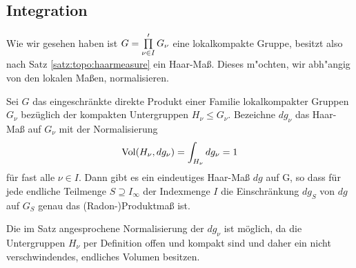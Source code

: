 \subsection{Integration}
		Wie wir gesehen haben ist $G=\prod\limits_{\nu\in I}' G_\nu$ eine lokalkompakte Gruppe, besitzt also nach Satz \ref{satz:topo:haarmeasure} ein Haar-Maß.
		Dieses m"ochten, wir abh"angig von den lokalen Maßen, normalisieren.
		\begin{satz}
			Sei $G$ das eingeschränkte direkte Produkt einer Familie lokalkompakter Gruppen $G_\nu$ bezüglich der kompakten Untergruppen $H_\nu \leq G_\nu$.
			Bezeichne $dg_\nu$ das Haar-Maß auf $G_\nu$ mit der Normalisierung
			\begin{align*}
				\operatorname{Vol}(H_\nu, dg_\nu) = \int_{H_\nu} dg_\nu = 1
			\end{align*}
			für fast alle $\nu\in I$. 
			Dann gibt es ein eindeutiges Haar-Maß $dg$ auf G, so dass für jede endliche Teilmenge $S\supseteq I_\infty$ der Indexmenge $I$ die Einschränkung $dg_S$ von $dg$ auf $G_S$ genau das (Radon-)Produktmaß ist.
		\end{satz}
		Die im Satz angesprochene Normalisierung der $dg_\nu$ ist möglich, da die Untergruppen $H_\nu$ per Definition offen und kompakt sind und daher ein nicht verschwindendes, endliches Volumen besitzen.
